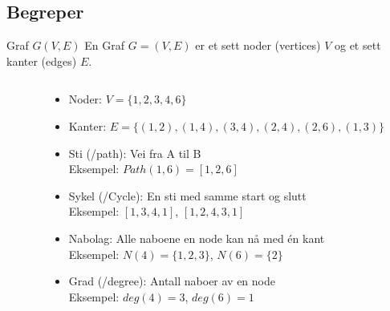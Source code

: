 \subsection*{Begreper}
\begin{frame}
    \begin{block}{Graf $G(V,E)$}
    En Graf $G = (V, E)$ er et sett noder (vertices) $V$ og et sett kanter (edges) $E$.
    \end{block}
    \pause

    \begin{columns}
        \begin{column}{0.28\textwidth}
        \end{column}
        \pause
        \begin{column}{0.68\textwidth}
            \begin{itemize}[<+->]
                \item Noder: $V=\{1,2,3,4,6\}$ \pause
                \item Kanter: $E=\{(1,2), (1,4), (3,4), (2,4), (2,6), (1,3)\}$\pause
                \item Sti (/path): Vei fra A til B\\
                Eksempel: $Path(1,6)=[1,2,6]$\pause
                \item Sykel (/Cycle): En sti med samme start og slutt\\
                Eksempel: $[1,3,4,1]$, $[1,2,4,3,1]$\pause
                \item Nabolag: Alle naboene en node kan nå med én kant\\
                Eksempel: $N(4)=\{1,2,3\}$, $N(6)=\{2\}$\pause
                \item Grad (/degree): Antall naboer av en node\\
                Eksempel: $deg(4)=3$, $deg(6)=1$
            \end{itemize}
        \end{column}
    \end{columns}
\end{frame}

